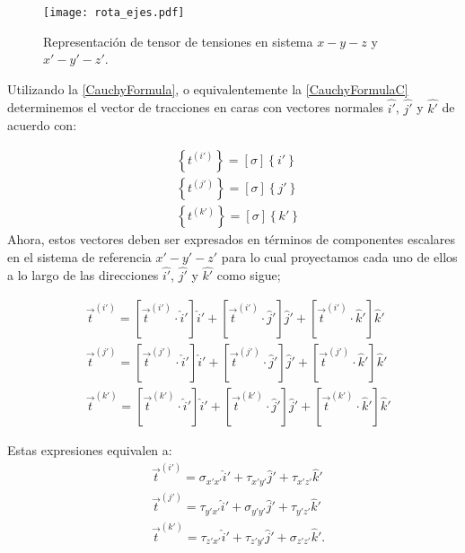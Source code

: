 \documentclass[../notas medios.tex]{subfiles}
\begin{document}
\begin{figure}[H]
\centering
	\texttt{[image: rota\_ejes.pdf]}
	\caption{Representación de tensor de tensiones en sistema $x-y-z$ y $x'-y'-z'$.}
	\label{roteje}
\end{figure}


Utilizando la \cref{CauchyFormula}, o equivalentemente la \cref{CauchyFormulaC} determinemos el vector de tracciones en caras
con vectores normales $\hat{i'}$, $\hat{j'}$ y $\hat{k'}$ de acuerdo con:
%

\begin{equation}
\begin{aligned}
&\left\{ {{t^{(i')}}} \right\} = \left[ \sigma  \right]\left\{ i' \right\} \\
&\left\{ {{t^{(j')}}} \right\} = \left[ \sigma  \right]\left\{ j' \right\} \\
&\left\{ {{t^{(k')}}} \right\} = \left[ \sigma  \right]\left\{ k' \right\}
\end{aligned}
\label{proy1}
\end{equation}
%
Ahora, estos vectores deben ser expresados en términos de componentes escalares en el sistema de referencia $x'-y'-z'$ para lo cual proyectamos cada uno de ellos a lo largo de las direcciones $\hat{i'}$, $\hat{j'}$ y $\hat{k'}$ como sigue;

\begin{equation}
\begin{aligned}
&{{\vec t}^{(i')}} = [{{\vec t}^{(i')}} \cdot \hat i']\hat i' + [{{\vec t}^{(i')}} \cdot \hat j']\hat j' + [{{\vec t}^{(i')}} \cdot \hat k']\hat k' \\
&{{\vec t}^{(j')}} = [{{\vec t}^{(j')}} \cdot \hat i']\hat i' + [{{\vec t}^{(j')}} \cdot \hat j']\hat j' + [{{\vec t}^{(j')}} \cdot \hat k']\hat k' \\
&{{\vec t}^{(k')}} = [{{\vec t}^{(k')}} \cdot \hat i']\hat i' + [{{\vec t}^{(k')}} \cdot \hat j']\hat j' + [{{\vec t}^{(k')}} \cdot \hat k']\hat k'
\end{aligned}
\label{proy2}
\end{equation}


%

%

Estas expresiones equivalen a:
%
\begin{align*}
& {{\vec t}^{(i')}} = {\sigma _{x'x'}}\hat i' + {\tau _{x'y'}}\hat j' + {\tau _{x'z'}}\hat k' \\
& {{\vec t}^{(j')}} = {\tau _{y'x'}}\hat i' + {\sigma _{y'y'}}\hat j' + {\tau _{y'z'}}\hat k' \\
&{{\vec t}^{(k')}} = {\tau _{z'x'}}\hat i' + {\tau _{z'y'}}\hat j' + {\sigma _{z'z'}}\hat k'.
\end{align*} \\
\end{document}
